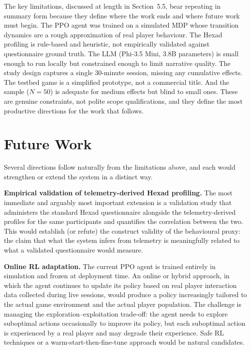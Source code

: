 The key limitations, discussed at length in Section~5.5, bear repeating in summary form because they define where the work ends and where future work must begin. The PPO agent was trained on a simulated MDP whose transition dynamics are a rough approximation of real player behaviour. The Hexad profiling is rule-based and heuristic, not empirically validated against questionnaire ground truth. The LLM (Phi-3.5 Mini, 3.8B parameters) is small enough to run locally but constrained enough to limit narrative quality. The study design captures a single 30-minute session, missing any cumulative effects. The testbed game is a simplified prototype, not a commercial title. And the sample ($N = 50$) is adequate for medium effects but blind to small ones. These are genuine constraints, not polite scope qualifications, and they define the most productive directions for the work that follows.

\section{Future Work}

Several directions follow naturally from the limitations above, and each would strengthen or extend the system in a distinct way.

\textbf{Empirical validation of telemetry-derived Hexad profiling.} The most immediate and arguably most important extension is a validation study that administers the standard Hexad questionnaire alongside the telemetry-derived profiles for the same participants and quantifies the correlation between the two. This would establish (or refute) the construct validity of the behavioural proxy: the claim that what the system infers from telemetry is meaningfully related to what a validated questionnaire would measure.

\textbf{Online RL adaptation.} The current PPO agent is trained entirely in simulation and frozen at deployment time. An online or hybrid approach, in which the agent continues to update its policy based on real player interaction data collected during live sessions, would produce a policy increasingly tailored to the actual game environment and the actual player population. The challenge is managing the exploration--exploitation trade-off: the agent needs to explore suboptimal actions occasionally to improve its policy, but each suboptimal action is experienced by a real player and may degrade their experience. Safe RL techniques or a warm-start-then-fine-tune approach would be natural candidates.

